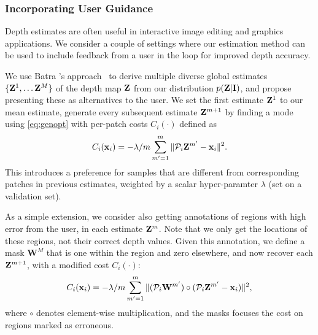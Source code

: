 \documentclass[10pt,twocolumn,letterpaper]{article}
\begin{document}
\subsubsection{Incorporating User Guidance}

Depth estimates are often useful in interactive image editing and graphics applications. We consider a couple of settings where our estimation method can be used to include feedback from a user in the loop for improved depth accuracy.

 We use Batra \etal's approach~\cite{batra2012diverse} to derive multiple diverse global estimates $\{\mathbf{Z}^1,\ldots \mathbf{Z}^M\}$ of the depth map $\mathbf{Z}$ from our distribution $p(\mathbf{Z}|\mathbf{I})$, and propose presenting these as alternatives to the user. We set the first estimate $\mathbf{Z}^1$ to our mean estimate, generate every subsequent estimate $\mathbf{Z}^{m+1}$ by finding a mode using \eqref{eq:genopt} with per-patch costs $C_i(\cdot)$ defined as
\begin{equation}
  \label{eq:mbest}
  C_i(\mathbf{x}{}_i) = -\lambda/m \sum_{m'=1}^{m} \|\mathcal{P}_i{}\mathbf{Z}^{m'} - \mathbf{x}{}_i\|^2.
\end{equation}
This introduces a preference for samples that are different from corresponding patches in previous estimates, weighted by a scalar hyper-paramter $\lambda$ (set on a validation set).

 As a simple extension, we consider also getting annotations of regions with high error from the user, in each estimate $\mathbf{Z}^m$. Note that we only get the locations of these regions, not their correct depth values. Given this annotation, we define a mask $\mathbf{W}^M$ that is one within the region and zero elsewhere, and now recover each $\mathbf{Z}^{m+1}$, with a modified cost $C_i(\cdot)$:
\begin{equation}
  \label{eq:obmbest}
  C_i(\mathbf{x}{}_i) = -\lambda/m \sum_{m'=1}^{m} \|(\mathcal{P}_i{}\mathbf{W}^{m'})\circ(\mathcal{P}_i{}\mathbf{Z}^{m'} - \mathbf{x}{}_i)\|^2,
\end{equation}
where $\circ$ denotes element-wise multiplication, and the masks focuses the cost on regions marked as erroneous.

\newcommand{\colorize}{Levin \cite{levin2004colorization}}
\newcommand{\solver}{Solver \cite{barron2016fast}}
\newcommand{\stod}{Ma \cite{ma2018sparse}}


\newcommand{\tspec}{\rowcolor{tspcolor}\cellcolor{white}&}
\renewcommand{\midrule}{\specialrule{0.1pt}{0pt}{.6pt}}
\renewcommand{\cline}[1]{\cmidrule{#1}}
\end{document}
